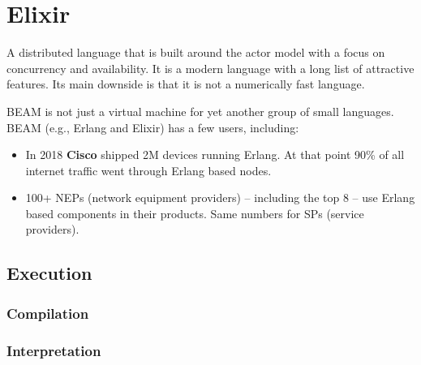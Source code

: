 {
\setmonofont[
  Contextuals={Alternate}
]{Fira Code}

\section{Elixir}

A distributed language that is built around the actor model with a focus on concurrency and availability. It is a modern language with a long list of attractive features. Its main downside is that it is not a numerically fast language.


BEAM is not just a virtual machine for yet another group of small languages. BEAM (e.g., Erlang and Elixir) has a few users, including: 
\begin{itemize}
   is using Elixir to scale to 5M concurrent users.
   uses Erlang to power its chat service serving 100M active users.
   uses Erlang to run messaging servers, each covering 2M users.
   uses Erlang for its GPRS, 3G, 4G and 5G infrastructure, and has a market share of 40\%.
  \item In 2018 \textbf{Cisco} shipped 2M devices running Erlang. At that point 90\% of all internet traffic went through Erlang based nodes.
  \item 100+ NEPs (network equipment providers) -- including the top 8 -- use Erlang based components in their products. Same numbers for SPs (service providers).
\end{itemize}

\subsection{Execution}
\subsubsection{Compilation}
\subsubsection{Interpretation}

}
